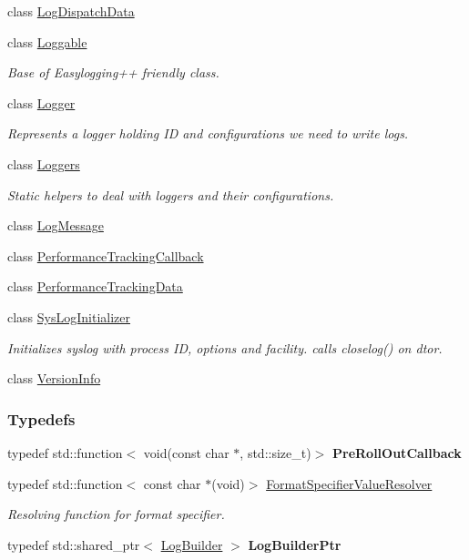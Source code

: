 \begin{DoxyCompactItemize}
\item 
class \hyperlink{a00044}{Log\+Dispatch\+Data}
\item 
class \hyperlink{a00047}{Loggable}
\begin{DoxyCompactList}\small\item\em Base of Easylogging++ friendly class. \end{DoxyCompactList}\item 
class \hyperlink{a00048}{Logger}
\begin{DoxyCompactList}\small\item\em Represents a logger holding I\+D and configurations we need to write logs. \end{DoxyCompactList}\item 
class \hyperlink{a00049}{Loggers}
\begin{DoxyCompactList}\small\item\em Static helpers to deal with loggers and their configurations. \end{DoxyCompactList}\item 
class \hyperlink{a00050}{Log\+Message}
\item 
class \hyperlink{a00066}{Performance\+Tracking\+Callback}
\item 
class \hyperlink{a00067}{Performance\+Tracking\+Data}
\item 
class \hyperlink{a00088}{Sys\+Log\+Initializer}
\begin{DoxyCompactList}\small\item\em Initializes syslog with process I\+D, options and facility. calls closelog() on d\textquotesingle{}tor. \end{DoxyCompactList}\item 
class \hyperlink{a00093}{Version\+Info}
\end{DoxyCompactItemize}
\subsubsection*{Typedefs}
\begin{DoxyCompactItemize}
\item 
\hypertarget{a00183_aeb764b890a6f3cd41d2726bcd4e9c0cf}{}typedef std\+::function$<$ void(const char $\ast$, std\+::size\+\_\+t)$>$ {\bfseries Pre\+Roll\+Out\+Callback}\label{a00183_aeb764b890a6f3cd41d2726bcd4e9c0cf}

\item 
\hypertarget{a00183_ab3cd18425a11df166a041d9024b8b5c6}{}typedef std\+::function$<$ const char $\ast$(void)$>$ \hyperlink{a00183_ab3cd18425a11df166a041d9024b8b5c6}{Format\+Specifier\+Value\+Resolver}\label{a00183_ab3cd18425a11df166a041d9024b8b5c6}

\begin{DoxyCompactList}\small\item\em Resolving function for format specifier. \end{DoxyCompactList}\item 
\hypertarget{a00183_ad4c4b2f7d70a4b02568a9f70724a6b39}{}typedef std\+::shared\+\_\+ptr$<$ \hyperlink{a00042}{Log\+Builder} $>$ {\bfseries Log\+Builder\+Ptr}\label{a00183_ad4c4b2f7d70a4b02568a9f70724a6b39}

\end{DoxyCompactItemize}
